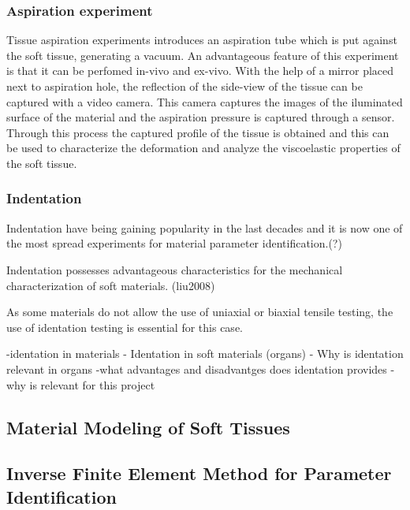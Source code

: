 \subsubsection{Aspiration experiment}

Tissue aspiration experiments introduces an aspiration tube which is put against the 
soft tissue, generating a vacuum. An advantageous feature of this experiment is that 
it can be perfomed in-vivo and ex-vivo.
With the help of a mirror placed next to aspiration 
hole, the reflection of the side-view of the tissue can be captured with a video camera.
This camera captures the images of the iluminated surface of the material and the 
aspiration pressure is captured through a sensor. Through this process the captured 
profile of the tissue is obtained and this can be used to characterize the deformation 
and analyze the viscoelastic properties of the soft tissue\cite{Kauer2002}.

\subsubsection{Indentation}
Indentation have being gaining popularity in the last decades and it is now one of
 the most spread experiments for material parameter identification.(?)

Indentation possesses advantageous characteristics for the mechanical characterization
of soft materials. (liu2008)

As some materials do not allow the use of uniaxial or biaxial tensile testing, the
 use of identation testing is essential for this case. 

-identation in materials
- Identation in soft materials (organs)
- Why is identation relevant in organs
-what advantages and disadvantges does identation provides
-why is relevant for this project 

\subsection{Material Modeling of Soft Tissues}
 


\subsection{Inverse Finite Element Method for Parameter Identification}

